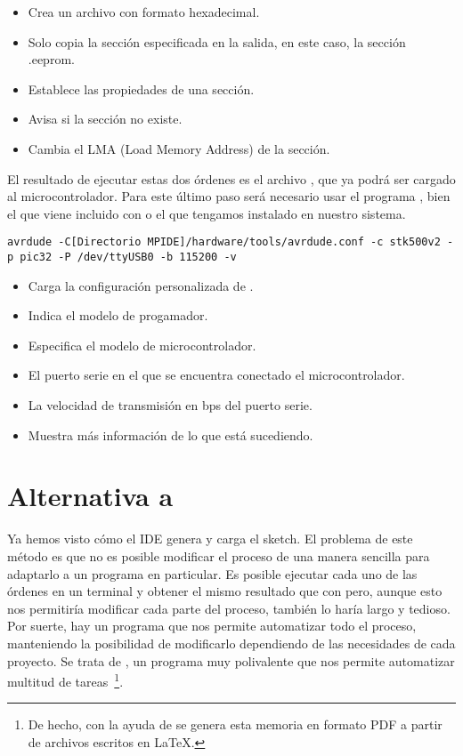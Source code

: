\begin{itemize}
  \item {} Crea un archivo con formato hexadecimal.
  \item {} Solo copia la sección especificada en la salida, en este caso, la sección .eeprom.
  \item {} Establece las propiedades de una sección.
  \item {} Avisa si la sección no existe.
  \item {} Cambia el LMA (Load Memory Address) de la sección.
\end{itemize}

El resultado de ejecutar estas dos órdenes es el archivo , que ya podrá ser cargado al microcontrolador.
Para este último paso será necesario usar el programa , bien el que viene incluido con  o el que tengamos instalado en nuestro sistema.
\begin{lstlisting}[breaklines=true]
avrdude -C[Directorio MPIDE]/hardware/tools/avrdude.conf -c stk500v2 -p pic32 -P /dev/ttyUSB0 -b 115200 -v
\end{lstlisting}

\begin{itemize}
  \item {} Carga la configuración personalizada de .
  \item {} Indica el modelo de progamador.
  \item {} Especifica el modelo de microcontrolador.
  \item {} El puerto serie en el que se encuentra conectado el microcontrolador.
  \item {} La velocidad de transmisión en bps del puerto serie.
  \item {} Muestra más información de lo que está sucediendo.
\end{itemize}

\section{Alternativa a }

Ya hemos visto cómo el IDE genera y carga el sketch. El problema de este método es que no es posible modificar el proceso de una manera sencilla para adaptarlo a un programa en particular. Es posible ejecutar cada uno de las órdenes en un terminal y obtener el mismo resultado que con  pero, aunque esto nos permitiría modificar cada parte del proceso, también lo haría largo y tedioso. Por suerte, hay un programa que nos permite automatizar todo el proceso, manteniendo la posibilidad de modificarlo dependiendo de las necesidades de cada proyecto. Se trata de , un programa muy polivalente que nos permite automatizar multitud de tareas~\footnote{De hecho, con la ayuda de  se genera esta memoria en formato PDF a partir de archivos escritos en \LaTeX.}.


